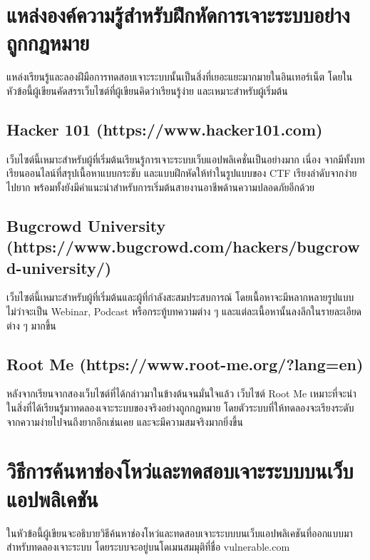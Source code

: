 \section{แหล่งองค์ความรู้สำหรับฝึกหัดการเจาะระบบอย่างถูกกฎหมาย}

แหล่งเรียนรู้และลองฝีมือการทดสอบเจาะระบบนั้นเป็นสิ่งที่เยอะแยะมากมายในอินเทอร์เน็ต โดยในหัวข้อนี้ผู้เขียนคัดสรรเว็บไซต์ที่ผู้เขียนคิดว่าเรียนรู้ง่าย และเหมาะสำหรับผู้เริ่มต้น

\subsection{Hacker 101 (https://www.hacker101.com)}

เว็บไซต์นี้เหมาะสำหรับผู้ที่เริ่มต้นเรียนรู้การเจาะระบบเว็บแอปพลิเคชั่นเป็นอย่างมาก เนี่อง จากมีทั้งบทเรียนออนไลน์ที่สรุปเนื้อหาแบบกระชับ และแบบฝึกหัดให้ทำในรูปแบบของ CTF \cite{??} เรียงลำดับจากง่ายไปยาก พร้อมทั้งยังมีคำแนะนำสำหรับการเริ่มต้นสายงานอาชีพด้านความปลอดภัยอีกด้วย

\subsection{Bugcrowd University (https://www.bugcrowd.com/hackers/bugcrowd-university/)}

เว็บไซต์นี้เหมาะสำหรับผู้ที่เริ่มต้นและผู้ที่กำลังสะสมประสบการณ์ โดยเนื้อหาจะมีหลากหลายรูปแบบ ไม่ว่าจะเป็น Webinar, Podcast หรือกระทู้บทความต่าง ๆ และแต่ละเนื้อหานั้นลงลึกในรายละเอียดต่าง ๆ มากขึ้น

\subsection{Root Me (https://www.root-me.org/?lang=en)}

หลังจากเรียนจากสองเว็บไซต์ที่ได้กล่าวมาในข้างต้นจนมั่นใจแล้ว เว็บไซต์ Root Me เหมาะที่จะนำในสิ่งที่ได้เรียนรู้มาทดลองเจาะระบบของจริงอย่างถูกกฎหมาย โดยตัวระบบที่ให้ทดลองจะเรียงระดับจากความง่ายไปจนถึงยากอีกเช่นเคย และจะมีความสมจริงมากยิ่งขึ้น

\section{วิธีการค้นหาช่องโหว่และทดสอบเจาะระบบบนเว็บแอปพลิเคชัน}
ในหัวข้อนี้ผู้เขียนจะอธิบายวิธีค้นหาช่องโหว่และทดสอบเจาะระบบบนเว็บแอปพลิเคชันที่ออกแบบมาสำหรับทดลองเจาะระบบ \cite{??} โดยระบบจะอยู่บนโดเมนสมมุติที่ชื่อ vulnerable.com

